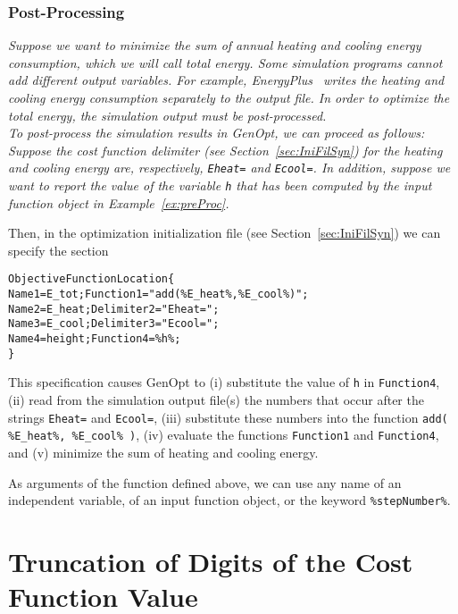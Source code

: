 \subsubsection{Post-Processing}
\begin{example}
{\em
Suppose we want to minimize the sum of annual heating and cooling energy consumption, 
which we will call \emph{total energy}. 
Some simulation programs cannot add different output variables.
For example, EnergyPlus~\cite{Crawley2001:1}
writes the heating and cooling energy consumption separately 
to the output file. 
In order to optimize the total energy, 
the simulation output must be post-processed.\\

To post-process the simulation results in GenOpt, we can proceed as follows:\\
Suppose the cost function delimiter (see Section~\ref{sec:IniFilSyn}) 
for the heating and cooling energy are, respectively, 
\texttt{Eheat=} and \texttt{Ecool=}.
In addition, suppose we want to report the value of the variable \texttt{h} that has been 
computed by the input function object in Example~\ref{ex:preProc}.
 

Then, in the optimization initialization file 
(see Section~\ref{sec:IniFilSyn}) we can specify the section
\begin{alltt}
  ObjectiveFunctionLocation\{
     Name1 = E_tot;  Function1 = "add( \%E_heat\%, \%E_cool\% )";
     Name2 = E_heat; Delimiter2 = "Eheat=";  
     Name3 = E_cool; Delimiter3 = "Ecool=";  
     Name4 = height; Function4  = \%h\%; 
  \}
\end{alltt}
This specification causes GenOpt to 
(i) substitute the value of \texttt{h} in \texttt{Function4}, 
(ii) read from the simulation output file(s) the numbers that occur after the 
strings \texttt{Eheat=} and \texttt{Ecool=}, 
(iii) substitute these numbers into the function
\texttt{add( \%E\_heat\%, \%E\_cool\% )}, 
(iv) evaluate the functions \texttt{Function1} and 
\texttt{Function4},
and (v) minimize the sum of heating and cooling energy.
}
\rbox
\label{ex:postProc}
\end{example}

As arguments of the function defined above, we can use any name of an 
independent variable, of an input function object,
or the keyword \texttt{\%stepNumber\%}.\\

\section{Truncation of Digits of the Cost Function Value}
\label{sec:hanOfNulSpaGen}

